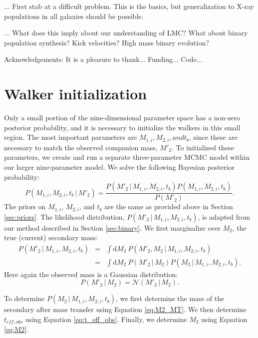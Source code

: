 \documentclass[12pt, preprint]{aastex}
\newcommand{\given}{\,|\,}
\newcommand{\dd}{\mathrm{d}}
\begin{document}
... First stab at a difficult problem. This is the basics, but generalization to X-ray populations in all galaxies should be possible.

... What does this imply about our understanding of LMC? What about binary population synthesis? Kick velocities? High mass binary evolution?



\acknowledgements
Acknowledgements:
It is a pleasure to thank...
Funding...
Code...



\appendix

\section{Walker initialization}

Only a small portion of the nine-dimensional parameter space has a non-zero posterior probability, and it is necessary to initialize the walkers in this small region. The most important parameters are $M_{1,i}, M_{2,i}, and t_b$, since these are necessary to match the observed companion mass, $M'_2$. To initialized these parameters, we create and run a separate three-parameter MCMC model within our larger nine-parameter model. We solve the following Bayesian posterior probability:
\begin{equation}
P(M_{1,i}, M_{2,i}, t_b \given M'_2) = \frac{ P(M'_2 \given M_{1,i}, M_{2,i}, t_b ) P( M_{1,i}, M_{2,i}, t_b )}{P(M'_2)}.
\end{equation}
The priors on $M_{1,i}$, $M_{2,i}$, and $t_b$ are the same as provided above in Section \ref{sec:priors}. The likelihood distribution, $P(M'_2 \given M_{1,i}, M_{2,i}, t_b )$, is adapted from our method described in Section \ref{sec:binary}. We first marginalize over $M_2$, the true (current) secondary mass:
\begin{eqnarray}
P(M'_2 \given M_{1,i}, M_{2,i}, t_b ) &=& \int \dd M_2\ P(M'_2, M_2 \given M_{1,i}, M_{2,i}, t_b ) \nonumber \\
&=& \int \dd M_2\ P(M'_2 \given M_2) P(M_2 \given M_{1,i}, M_{2,i}, t_b).
\end{eqnarray}
Here again the observed mass is a Gaussian distribution: 
\begin{equation}
P(M'_2 \given M_2) = \mathcal{N}(M'_2 \given M_2).
\end{equation}

To determine $P(M_2 \given M_{1,i}, M_{2,i}, t_b )$, we first determine the mass of the secondary after mass transfer using Equation \ref{eq:M2_MT}. We then determine $t_{eff,obs}$ using Equation \ref{eq:t_eff_obs}. Finally, we determine $M_2$ using Equation \ref{eq:M2}.
\end{document}
